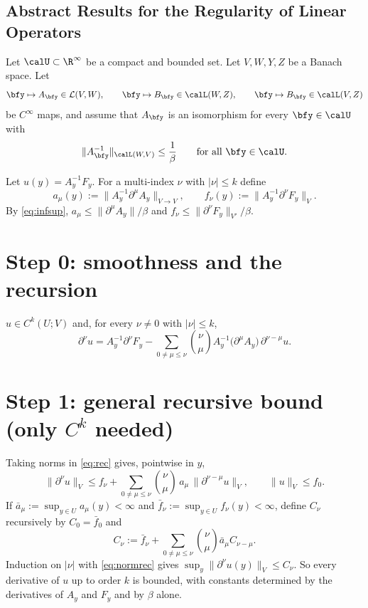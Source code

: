 
\subsection{Abstract Results for the Regularity of Linear Operators}\label{subsec:abstractResults}
Let $\calU \subset \R^\infty$ be a compact and bounded set.
Let $V,W, Y,Z$ be a Banach space. Let
\[
  \bfy \mapsto A_\bfy \in\mathcal L(V,W),\qquad \bfy \mapsto B_\bfy\in \calL(W,Z),\qquad \bfy \mapsto B_\bfy\in \calL(V,Z)
\]
be $C^\infty$ maps, and assume that $A_\bfy$ is an isomorphism for every $\bfy\in \calU$ with
\begin{equation}\label{eq:infsup}
  \|A_\bfy^{-1}\|_{\calL(W,V)}\le\frac1\beta\qquad\text{for all } \bfy\in \calU.
\end{equation}

Let $u(y)=A_y^{-1}F_y$. For a multi-index $\nu$ with $|\nu|\le k$ define
\[
  a_\mu(y):=\|A_y^{-1}\partial^\mu A_y\|_{V\to V},\qquad
  f_\nu(y):=\|A_y^{-1}\partial^\nu F_y\|_{V}.
\]
By \eqref{eq:infsup}, $a_\mu\le\|\partial^\mu A_y\|/\beta$ and
$f_\nu\le\|\partial^\nu F_y\|_{V'}/\beta$.

\section*{Step 0: smoothness and the recursion}

\begin{lemma}\label{lem:rec}
$u\in C^k(U;V)$ and, for every $\nu\neq0$ with $|\nu|\le k$,
\begin{equation}\label{eq:rec}
  \partial^\nu u
  = A_y^{-1}\partial^\nu F_y
  -\sum_{0\ne\mu\le\nu}\binom{\nu}{\mu}A_y^{-1}\big(\partial^\mu A_y\big)\,\partial^{\nu-\mu}u .
\end{equation}
\end{lemma}


\section*{Step 1: general recursive bound (only $C^k$ needed)}

Taking norms in \eqref{eq:rec} gives, pointwise in $y$,
\begin{equation}\label{eq:normrec}
  \|\partial^\nu u\|_V\le f_\nu+\sum_{0\ne\mu\le\nu}\binom{\nu}{\mu}\,a_\mu\,\|\partial^{\nu-\mu}u\|_V,
  \qquad \|u\|_V\le f_0 .
\end{equation}
If $\bar a_\mu:=\sup_{y\in U}a_\mu(y)<\infty$ and $\bar f_\nu:=\sup_{y\in U}f_\nu(y)<\infty$,
define $C_\nu$ recursively by $C_0=\bar f_0$ and
\[
  C_\nu:=\bar f_\nu+\sum_{0\ne\mu\le\nu}\binom{\nu}{\mu}\bar a_\mu C_{\nu-\mu}.
\]
Induction on $|\nu|$ with \eqref{eq:normrec} gives $\sup_{y}\|\partial^\nu u(y)\|_V\le C_\nu$.
So every derivative of $u$ up to order $k$ is bounded, with constants determined by the
derivatives of $A_y$ and $F_y$ and by $\beta$ alone.

